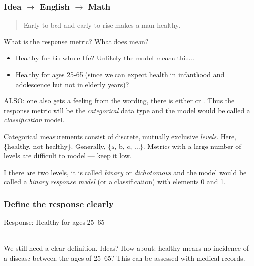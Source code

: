 \documentclass[slides]{beamer} %
\begin{document}
\begin{frame}\frametitle{Idea $\rightarrow$ English $\rightarrow$ Math}

\small
\begin{quotation}
Early to bed and early to rise makes a man healthy.
\end{quotation}

What is the response metric? \pause What does  mean?\\

\begin{itemize}
\item Healthy for his whole life? \pause Unlikely the model means this... \pause 
\item Healthy for ages 25-65 (since we can expect health in infanthood and adolescence but not in elderly years)?
\end{itemize}

ALSO: one also gets a feeling from the wording, there is either  or . \pause  Thus the response metric will be the \textit{categorical} data type and the model would be called a \textit{classification} model. \\\vspace{0.2cm} \pause 

Categorical measurements consist of discrete, mutually exclusive \textit{levels}. Here, \{healthy, not healthy\}.  \pause Generally, \{a, b, c, $\ldots$\}. Metrics with a large number of levels are difficult to model --- keep it low.\\\vspace{0.2cm} \pause 

I there are two levels, it is called \textit{binary} or \textit{dichotomous} and the model would be called a \textit{binary response model} (or a classification) with elements 0 and 1.
	
\end{frame}

\begin{frame}\frametitle{Define the response clearly}

Response: Healthy for ages 25--65 \\~\\ \pause 

We still need a clear definition. Ideas?  \pause How about: healthy means no incidence of a  disease between the ages of 25--65? This can be assessed with medical records. 
	
\end{frame}
\end{document}
